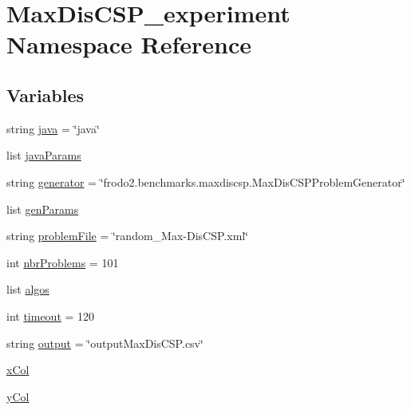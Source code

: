 \hypertarget{namespaceMaxDisCSP__experiment}{}\section{Max\+Dis\+C\+S\+P\+\_\+experiment Namespace Reference}
\label{namespaceMaxDisCSP__experiment}
\subsection*{Variables}
\begin{DoxyCompactItemize}
\item 
string \hyperlink{namespaceMaxDisCSP__experiment_aa778f334e146efb81f06d91a127e852e}{java} = \char`\"{}java\char`\"{}
\item 
list \hyperlink{namespaceMaxDisCSP__experiment_a557bebaa7dae8d8275e25b76df4a7ad2}{java\+Params}
\item 
string \hyperlink{namespaceMaxDisCSP__experiment_aaba77ea389ee9c9f69d9d4c5979a17b1}{generator} = \char`\"{}frodo2.\+benchmarks.\+maxdiscsp.\+Max\+Dis\+C\+S\+P\+Problem\+Generator\char`\"{}
\item 
list \hyperlink{namespaceMaxDisCSP__experiment_a9bae2616b8b6f531f6b368e8b49e272c}{gen\+Params}
\item 
string \hyperlink{namespaceMaxDisCSP__experiment_a33b70bc81f4d5bb7fa331364dbd3911c}{problem\+File} = \char`\"{}random\+\_\+\+Max-\/Dis\+C\+S\+P.\+xml\char`\"{}
\item 
int \hyperlink{namespaceMaxDisCSP__experiment_ab85d28864ad0510b5a36351bc144c387}{nbr\+Problems} = 101
\item 
list \hyperlink{namespaceMaxDisCSP__experiment_ab252e0e7945c449f04928e25bfe7777b}{algos}
\item 
int \hyperlink{namespaceMaxDisCSP__experiment_aa09f7b9725386e9fdf9644567935a3b5}{timeout} = 120
\item 
string \hyperlink{namespaceMaxDisCSP__experiment_a180221711d5ce1688f14955f0f9a2f5e}{output} = \char`\"{}output\+Max\+Dis\+C\+S\+P.\+csv\char`\"{}
\item 
\hyperlink{namespaceMaxDisCSP__experiment_ac3613b02dbe8b81924595212800c41ae}{x\+Col}
\item 
\hyperlink{namespaceMaxDisCSP__experiment_a598c648ca43919f6d93e4858f5c92877}{y\+Col}
\end{DoxyCompactItemize}



